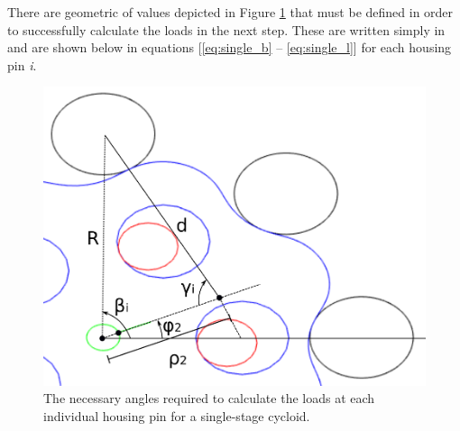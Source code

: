 There are geometric of values depicted in Figure \ref{fig:single_loads_angles} that must be defined in order to successfully calculate the loads in the next step. These are written simply in \cite{ref:hwang_geometry} and are shown below in equations [\ref{eq:single_b} -- \ref{eq:single_l}] for each housing pin \textit{i}. 

\begin{figure}[h]
   \centering
   \includegraphics[width=0.6\linewidth]{fig/single_loads_angles}
   \caption{The necessary angles required to calculate the loads at each individual housing pin for a single-stage cycloid.}
   \label{fig:single_loads_angles}
\end{figure}

